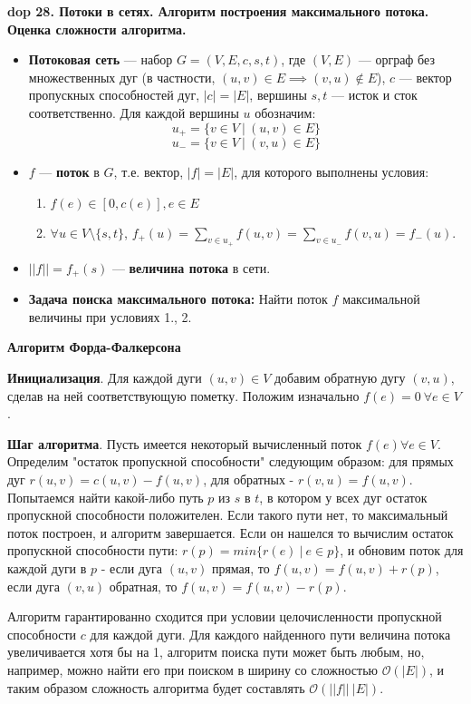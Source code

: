 \textbf{\LARGE dop 28. Потоки в сетях. Алгоритм построения максимального потока. Оценка сложности алгоритма.}


\begin{itemize}
    \item \textbf{Потоковая сеть} --- набор $G = (V, E, c, s, t)$, где $(V, E)$ --- орграф без множественных дуг (в частности, $(u,v) \in E \implies (v, u) \notin E$), $c$ --- вектор пропускных способностей дуг, $|c| = |E|$, вершины $s, t$ --- исток и сток соответственно. Для каждой вершины $u$ обозначим:
    $$ u_+ = \{v \in V~|~(u, v) \in E\}$$
    $$u_- = \{v \in V~|~(v, u) \in E\}$$
    \item $f$ --- \textbf{поток} в $G$, т.е. вектор, $|f| = |E|$, для которого выполнены условия:
    \begin{enumerate}
        \item $f(e) \in [0, c(e)], e \in E$
        \item $\forall u \in V \setminus\{s, t\}$, $f_+(u) = \sum_{v \in u_+} f(u, v) = \sum_{v \in u_-} f (v, u) = f_-(u)$.
    \end{enumerate}
    \item $||f|| = f_+(s)$ --- \textbf{величина потока} в сети.
    \item \textbf{Задача поиска максимального потока:}
    Найти поток $f$ максимальной величины при условиях 1., 2.
\end{itemize}

\textbf{Алгоритм Форда-Фалкерсона}

\textbf{Инициализация}.
Для каждой дуги $(u, v) \in V$ добавим обратную дугу $(v, u)$, сделав на ней соответствующую пометку. Положим изначально $f(e) = 0 ~ \forall e \in V$.

\textbf{Шаг алгоритма}.
Пусть имеется некоторый вычисленный поток $f(e) \forall e \in V$. Определим "остаток пропускной способности" следующим образом: для прямых дуг $r(u,v) = c(u,v) - f(u,v)$, для обратных - $r(v,u) = f(u,v)$. Попытаемся найти какой-либо путь $p$ из $s$ в $t$, в котором у всех дуг остаток пропускной способности положителен. Если такого пути нет, то максимальный поток построен, и алгоритм завершается. Если он нашелся то вычислим остаток пропускной способности пути: $r(p) = min\{r(e)~|~e \in p\}$, и обновим поток для каждой дуги в $p$ - если дуга $(u, v)$ прямая, то $f(u, v) = f(u, v) + r(p)$, если дуга $(v, u)$ обратная, то $f(u, v) = f(u, v) - r(p)$. 

Алгоритм гарантированно сходится при условии целочисленности пропускной способности $c$ для каждой дуги. Для каждого найденного пути величина потока увеличивается хотя бы на 1, алгоритм поиска пути может быть любым, но, например, можно найти его при поиском в ширину со сложностью $\mathcal{O}(|E|)$, и таким образом сложность алгоритма будет составлять $\mathcal{O}(||f||~|E|)$.

